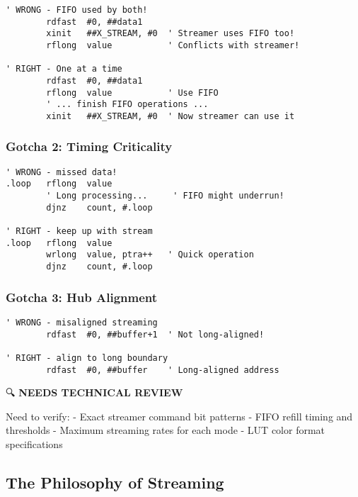 \documentclass[11pt]{book}
\begin{document}
\begin{lstlisting}
' WRONG - FIFO used by both!
        rdfast  #0, ##data1
        xinit   ##X_STREAM, #0  ' Streamer uses FIFO too!
        rflong  value           ' Conflicts with streamer!
        
' RIGHT - One at a time
        rdfast  #0, ##data1
        rflong  value           ' Use FIFO
        ' ... finish FIFO operations ...
        xinit   ##X_STREAM, #0  ' Now streamer can use it
\end{lstlisting}

\hypertarget{gotcha-2-timing-criticality}{%
\subsubsection{Gotcha 2: Timing
Criticality}\label{gotcha-2-timing-criticality}}

\begin{lstlisting}
' WRONG - missed data!
.loop   rflong  value
        ' Long processing...     ' FIFO might underrun!
        djnz    count, #.loop
        
' RIGHT - keep up with stream
.loop   rflong  value
        wrlong  value, ptra++   ' Quick operation
        djnz    count, #.loop
\end{lstlisting}

\hypertarget{gotcha-3-hub-alignment}{%
\subsubsection{Gotcha 3: Hub Alignment}\label{gotcha-3-hub-alignment}}

\begin{lstlisting}
' WRONG - misaligned streaming
        rdfast  #0, ##buffer+1  ' Not long-aligned!
        
' RIGHT - align to long boundary
        rdfast  #0, ##buffer    ' Long-aligned address
\end{lstlisting}

\begin{review}
🔍 \textbf{NEEDS TECHNICAL REVIEW}

Need to verify:
- Exact streamer command bit patterns
- FIFO refill timing and thresholds
- Maximum streaming rates for each mode
- LUT color format specifications
\end{review}

\hypertarget{the-philosophy-of-streaming}{%
\subsection{The Philosophy of
Streaming}\label{the-philosophy-of-streaming}}
\end{document}
